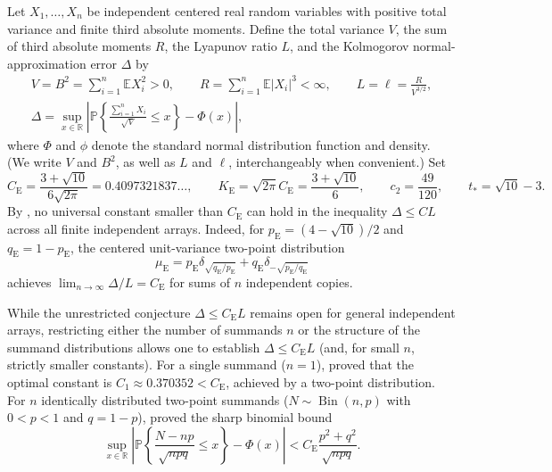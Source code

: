 \documentclass[11pt]{article}
\numberwithin{equation}{section}
\theoremstyle{definition}
\theoremstyle{remark}
\DeclareMathOperator{\Bin}{Bin}
\newcommand{\E}{\mathbb E}
\newcommand{\Pp}{\mathbb P}
\newcommand{\R}{\mathbb R}
\newcommand{\be}{C_{\mathrm E}}
\newcommand{\ke}{K_{\mathrm E}}
\begin{document}
Let $X_1,\ldots,X_n$ be independent centered real random variables with
positive total variance and finite third absolute moments. Define the total
variance $V$, the sum of third absolute moments $R$, the Lyapunov ratio $L$,
and the Kolmogorov normal-approximation error $\Delta$ by
\begin{equation}\label{eq:normalization}
\begin{gathered}
 V=B^2=\sum_{i=1}^n\E X_i^2>0,\qquad
 R=\sum_{i=1}^n\E|X_i|^3<\infty,\qquad
 L=\ell=\frac{R}{V^{3/2}},\\
 \Delta=\sup_{x\in\R}\left|\Pp\left\{\frac{\sum_{i=1}^nX_i}{\sqrt V}\le x\right\}-\Phi(x)\right|,
\end{gathered}
\end{equation}
where $\Phi$ and $\phi$ denote the standard normal distribution function
and density. (We write $V$ and $B^2$, as well as $L$ and $\ell$,
interchangeably when convenient.) Set
\begin{equation}\label{eq:esseen-constant}
 \be=\frac{3+\sqrt{10}}{6\sqrt{2\pi}}=0.4097321837\ldots,\qquad
 \ke=\sqrt{2\pi}\be=\frac{3+\sqrt{10}}6,
 \qquad c_2=\frac{49}{120},\qquad t_*=\sqrt{10}-3.
\end{equation}
By \citet{Esseen1956}, no universal constant smaller than $\be$ can hold in
the inequality $\Delta\le C L$ across all finite independent arrays. Indeed,
for $p_{\mathrm E}=(4-\sqrt{10})/2$ and $q_{\mathrm E}=1-p_{\mathrm E}$, the
centered unit-variance two-point distribution
\begin{equation}\label{eq:esseen-law}
 \mu_{\mathrm E}=p_{\mathrm E}\delta_{\sqrt{q_{\mathrm E}/p_{\mathrm E}}}
 +q_{\mathrm E}\delta_{-\sqrt{p_{\mathrm E}/q_{\mathrm E}}}
\end{equation}
achieves $\lim_{n\to\infty}\Delta/L=\be$ for sums of $n$ independent copies.

While the unrestricted conjecture $\Delta\le\be L$ remains open for general
independent arrays, restricting either the number of summands $n$ or the
structure of the summand distributions allows one to establish $\Delta\le\be L$
(and, for small $n$, strictly smaller constants). For a single summand
($n=1$), \citet[Theorem~1]{BentkusKirsa1989} proved that the optimal constant
is $C_1\approx0.370352<\be$, achieved by a two-point distribution. For $n$
identically distributed two-point summands ($N\sim\Bin(n,p)$ with $0<p<1$
and $q=1-p$), \citet[Theorem~1]{Schulz2016} proved the sharp binomial bound
\begin{equation}\label{eq:schulz}
 \sup_{x\in\R}\left|\Pp\left\{\frac{N-np}{\sqrt{npq}}\le x\right\}-\Phi(x)\right|
 <\be\frac{p^2+q^2}{\sqrt{npq}}.
\end{equation}
\end{document}
